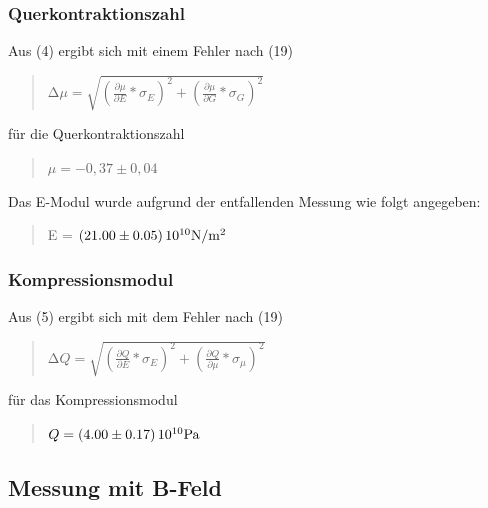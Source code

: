 \subsubsection{Querkontraktionszahl}

Aus (4)  ergibt sich mit einem Fehler nach (19) 

\begin{quote}
	$\increment \mu = \sqrt{(\frac{\partial \mu}{\partial E} * \sigma_{E})^2 + (\frac{\partial \mu}{\partial G} * \sigma_{G})^2}$
\end{quote}

für die Querkontraktionszahl 

\begin{quote}
	$\mu = -0,37 \pm 0,04$
\end{quote}

Das E-Modul wurde aufgrund der entfallenden Messung wie folgt angegeben: 
\begin{quote}
	E = $\SI{21.00\pm0.05}{\num{e10}\newton\per\square\metre}$
\end{quote}
\subsubsection{Kompressionsmodul}

Aus (5) ergibt sich mit dem Fehler nach (19)

\begin{quote}
	$\increment Q = \sqrt{(\frac{\partial Q}{\partial E} * \sigma_{E})^2 + (\frac{\partial Q}{\partial \mu} * \sigma_{\mu})^2}$
\end{quote}

für das Kompressionsmodul 

\begin{quote}
	$Q = \SI{4.00\pm0.17}{\num{e10}\pascal}$
\end{quote}


\subsection{Messung mit B-Feld}

